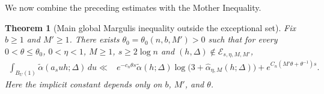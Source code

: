 \documentclass[reqno,11pt]{amsart}
\numberwithin{equation}{section}
\newtheorem{theorem}{Theorem}[section]
\theoremstyle{definition}
\theoremstyle{remark}
\begin{document}
We now combine the preceding estimates with the Mother Inequality.

\begin{theorem}[Main global Margulis inequality outside the exceptional set]\label{thm:globalcontraction}
Fix $b\ge1$ and $M'\ge1$. There exists
$\theta_0=\theta_0(n,b,M')>0$ such that for every
$0<\theta\le\theta_0$, $0<\eta<1$, $M\ge1$,
$s\ge 2\log n$ and
$(h,\Delta)\notin\mathcal E_{s,\eta,M,M'}$,
\begin{equation}\label{eq:globalcontraction}
\begin{aligned}
\int_{B_U(1)}
\widetilde\alpha(a_suh;\Delta)\,du
\ll{}&
e^{-c_n\theta s}
\widetilde\alpha(h;\Delta)
\log\!\bigl(3+\widehat\alpha_{\eta,M}(h;\Delta)\bigr)
+e^{C_n(M'\theta+\theta^{-1})s}.
\end{aligned}
\end{equation} Here the implicit constant depends only on $b$, $M'$, and $\theta$.
\end{theorem}
\end{document}
